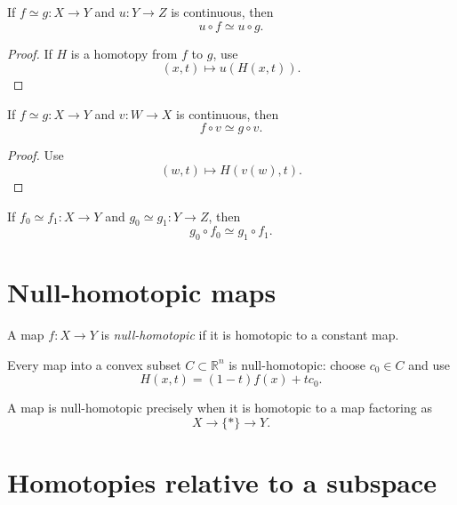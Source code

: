 \begin{proposition}[Postcomposition]
\label{prop:viii01-postcomposition}
If \(f\simeq g:X\to Y\) and \(u:Y\to Z\) is continuous, then
\[
u\circ f\simeq u\circ g.
\]
\end{proposition}

\begin{proof}
If \(H\) is a homotopy from \(f\) to \(g\), use
\[
(x,t)\longmapsto u(H(x,t)).
\]
\end{proof}

\begin{proposition}[Precomposition]
\label{prop:viii01-precomposition}
If \(f\simeq g:X\to Y\) and \(v:W\to X\) is continuous, then
\[
f\circ v\simeq g\circ v.
\]
\end{proposition}

\begin{proof}
Use
\[
(w,t)\longmapsto H(v(w),t).
\]
\end{proof}

\begin{corollary}
\label{cor:viii01-two-sided}
If \(f_0\simeq f_1:X\to Y\) and \(g_0\simeq g_1:Y\to Z\), then
\[
g_0\circ f_0\simeq g_1\circ f_1.
\]
\end{corollary}

\section{Null-homotopic maps}

\begin{definition}
\label{def:viii01-null}
A map \(f:X\to Y\) is \emph{null-homotopic} if it is homotopic to a constant
map.
\end{definition}

\begin{example}
\label{ex:viii01-convex-null}
Every map into a convex subset \(C\subset\mathbb R^n\) is null-homotopic:
choose \(c_0\in C\) and use
\[
H(x,t)=(1-t)f(x)+tc_0.
\]
\end{example}

\begin{proposition}
\label{prop:viii01-point-factor}
A map is null-homotopic precisely when it is homotopic to a map factoring as
\[
X\longrightarrow \{*\}\longrightarrow Y.
\]
\end{proposition}

\section{Homotopies relative to a subspace}

